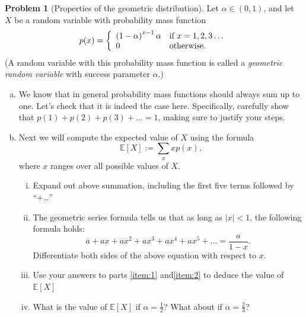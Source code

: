 \documentclass[10pt]{article}
\theoremstyle{definition}
\newtheorem{problem}[theorem]{Problem}
\newcommand{\1}[1]{\textbf{1}_{\left[#1\right]}} %
\def\E{\mathbb{E}} %
\begin{document}
\begin{problem}[Properties of the geometric distribution]
  Let $\alpha\in (0,1)$, and let $X$ be a random variable with probability mass function
  \begin{equation*}
    p(x) = \left\{ \begin{array}{l@{\quad}l} \left( 1-\alpha \right)^{x-1}\alpha  & \text{if }x=1,2,3\ldots\\0 & \text{otherwise.} \end{array}\right.
  \end{equation*}
  (A random variable with this probability mass function is called a \textit{geometric random variable} with success parameter $\alpha$.)

  \begin{enumerate}[(a)]
    \item We know that in general probability mass functions should always sum
    up to one. Let's check that it is indeed the case here. Specifically,
    carefully show that $p(1)+p(2)+p(3)+\ldots =1$, making sure to justify
    your steps.
    \item Next we will compute the expected value of $X$ using the formula 
    \begin{equation*}
      \E\left[X \right] := \sum_{x}x p(x),
    \end{equation*}
    where $x$ ranges over all possible values of $X$.
    \begin{enumerate}[(i)]
      \item \label{item:1} Expand out above summation, including the first five terms followed by ``+\dots''
      \item \label{item:2} The geometric series formula tells us that as long as $|x|<1$, the following
      formula holds:
      \begin{equation*}
        a + ax+ax^{2}+ax^{3}+ax^{4}+ax^{5}+\ldots = \frac{a}{1-x}.
      \end{equation*}
      Differentiate both sides of the above equation with respect to $x$. 
      \item Use your answers to parts \ref{item:1} and\ref{item:2} to deduce the value of
      $\E\left[X \right]$
      \item What is the value of $\E\left[X \right]$ if $\alpha=\frac{1}{2}$? What about if
      $\alpha=\frac{2}{3}$?
    \end{enumerate}
  \end{enumerate}
\end{problem}
\end{document}
